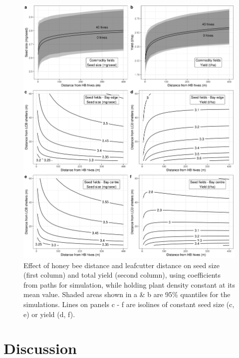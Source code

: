 \documentclass[12pt]{article} %
\begin{document}
\begin{figure}
    \centering
    \includegraphics[width=\textwidth,keepaspectratio=true]{../Figures/allYield.png}
    \caption{Effect of honey bee distance and leafcutter distance on seed size (first column) and total yield (second column), using coefficients from paths for simulation, while holding plant density constant at its mean value. Shaded areas shown in a \& b are 95\% quantiles for the simulations. Lines on panels c - f are isolines of constant seed size (c, e) or yield (d, f).}
    \label{fig:allYield}
\end{figure}

\section*{Discussion}
\end{document}

